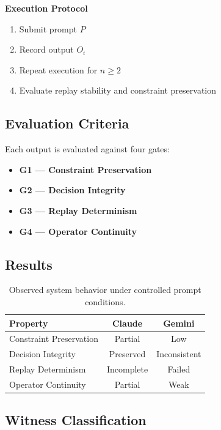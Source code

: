 \documentclass[11pt]{article}
\begin{document}
\textbf{Execution Protocol}

\begin{enumerate}
    \item Submit prompt $P$
    \item Record output $O_i$
    \item Repeat execution for $n \geq 2$
    \item Evaluate replay stability and constraint preservation
\end{enumerate}

\subsection{Evaluation Criteria}

Each output is evaluated against four gates:

\begin{itemize}
    \item \textbf{G1 --- Constraint Preservation}
    \item \textbf{G2 --- Decision Integrity}
    \item \textbf{G3 --- Replay Determinism}
    \item \textbf{G4 --- Operator Continuity}
\end{itemize}

\subsection{Results}

\begin{table}[h]
\centering
\begin{tabular}{|l|c|c|}
\hline
\textbf{Property} & \textbf{Claude} & \textbf{Gemini} \\ \hline
Constraint Preservation & Partial & Low \\ \hline
Decision Integrity & Preserved & Inconsistent \\ \hline
Replay Determinism & Incomplete & Failed \\ \hline
Operator Continuity & Partial & Weak \\ \hline
\end{tabular}
\caption{Observed system behavior under controlled prompt conditions.}
\label{tab:results}
\end{table}

\subsection{Witness Classification}
\end{document}
